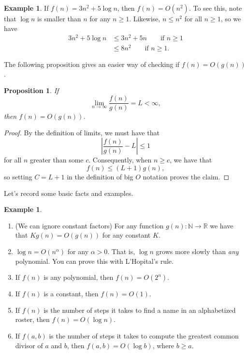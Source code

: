 \documentclass[12pt]{article}
\theoremstyle{plain}
\newtheorem{proposition}[theorem]{Proposition}
\theoremstyle{definition}
\newtheorem{example}[theorem]{Example}
\theoremstyle{remark}
\newcommand{\N}{\mathbb{N}}
\newcommand{\R}{\mathbb{R}}
\begin{document}
\begin{example}
    If $f(n) = 3n^2 + 5\log n$, then $f(n) = O(n^2)$.
    To see this, note that $\log n$ is smaller than $n$ for any $n \geq 1$.
    Likewise, $n \leq n^2$ for all $n \geq 1$, so we have
    \begin{align*}
        3n^2 + 5\log n &\leq 3n^2 + 5n \qquad \text{if }n \geq 1\\
        &\leq 8n^2 \qquad \text{if }n\geq 1.
    \end{align*}
\end{example}


The following proposition gives an easier way of checking if $f(n) = O(g(n))$.
\begin{proposition}
    If
    \[
        \lim_{n\to \infty}\frac{f(n)}{g(n)} = L < \infty,
    \]
    then $f(n) = O(g(n))$.
\end{proposition}
\begin{proof}
    By the definition of limits, we must have that
    \[
        \left|\frac{f(n)}{g(n)} - L\right| \leq 1
    \]
    for all $n$ greater than some $c$.
    Consequently, when $n \geq c$, we have that
    \[
        f(n) \leq (L+1)g(n),
    \]
    so setting $C = L+1$ in the definition of big $O$ notation proves the claim.
\end{proof}


Let's record some basic facts and examples.
\begin{example}
    \begin{enumerate}
        \item (We can ignore constant factors) For any function $g(n): \N\to \R$ we have that $Kg(n) = O(g(n))$ for any constant $K$.

        \item $\log n = O(n^\alpha)$ for any $\alpha > 0$. That is, $\log n$ grows more slowly than \emph{any} polynomial.
        You can prove this with L'Hopital's rule.

        \item If $f(n)$ is any polynomial, then $f(n) = O(2^n)$.

        \item If $f(n)$ is a constant, then $f(n) = O(1)$.

        \item If $f(n)$ is the number of steps it takes to find a name in an alphabetized roster, then $f(n) = O(\log n)$.

        \item If $f(a,b)$ is the number of steps it takes to compute the greatest common divisor of $a$ and $b$, then $f(a,b) = O(\log b)$, where $b \geq a$.
    \end{enumerate}
\end{example}
\end{document}
